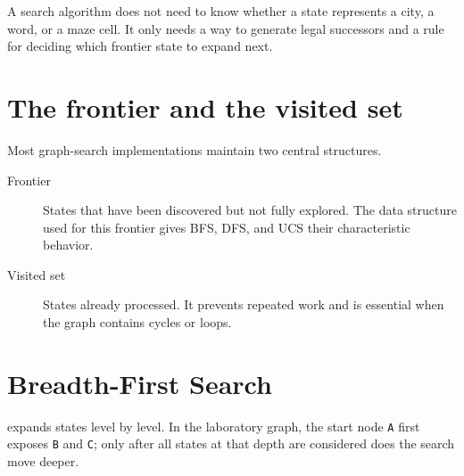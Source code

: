 \begin{intuition}
A search algorithm does not need to know whether a state represents a city, a word, or a maze cell. It only needs a way to generate legal successors and a rule for deciding which frontier state to expand next.
\end{intuition}

\section{The frontier and the visited set}

Most graph-search implementations maintain two central structures.

\begin{description}
  \item[Frontier] States that have been discovered but not fully explored. The data structure used for this frontier gives BFS, DFS, and UCS their characteristic behavior.
  \item[Visited set] States already processed. It prevents repeated work and is essential when the graph contains cycles or loops.
\end{description}

\begin{mlfigure}
\end{mlfigure}

\section{Breadth-First Search}

 expands states level by level. In the laboratory graph, the start node \texttt{A} first exposes \texttt{B} and \texttt{C}; only after all states at that depth are considered does the search move deeper.

